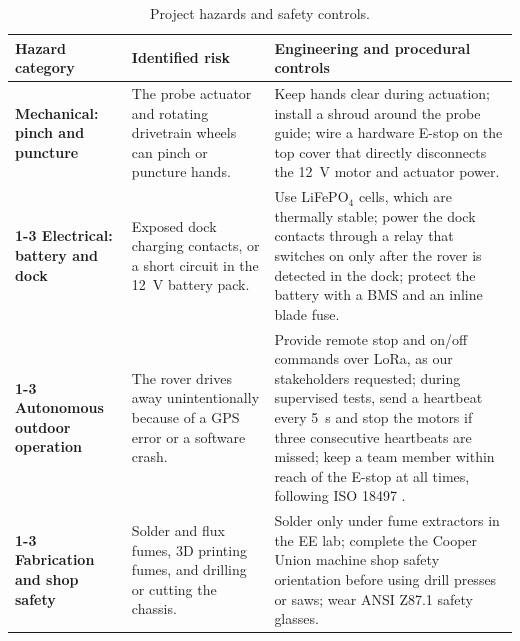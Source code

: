 \documentclass[12pt, letterpaper]{article}
\begin{document}
\begin{table}[htbp]
    \centering
    \footnotesize
    \setlength{\extrarowheight}{2pt}
    \begin{tabularx}{\textwidth}{@{}>{\raggedright\arraybackslash\bfseries}p{} >{\raggedright\arraybackslash}p{} >{\raggedright\arraybackslash}X@{}}
    \toprule
    \textbf{Hazard category} & \textbf{Identified risk} & \textbf{Engineering and procedural controls} \\
    \midrule[0.8pt]
    Mechanical: pinch and puncture & The probe actuator and rotating drivetrain wheels can pinch or puncture hands. & Keep hands clear during actuation; install a shroud around the probe guide; wire a hardware E-stop on the top cover that directly disconnects the 12~V motor and actuator power. \\
    \cmidrule[0.2pt]{1-3}
    Electrical: battery and dock & Exposed dock charging contacts, or a short circuit in the 12~V battery pack. & Use LiFePO$_4$ cells, which are thermally stable; power the dock contacts through a relay that switches on only after the rover is detected in the dock; protect the battery with a BMS and an inline blade fuse. \\
    \cmidrule[0.2pt]{1-3}
    Autonomous outdoor operation & The rover drives away unintentionally because of a GPS error or a software crash. & Provide remote stop and on/off commands over LoRa, as our stakeholders requested; during supervised tests, send a heartbeat every 5~s and stop the motors if three consecutive heartbeats are missed; keep a team member within reach of the E-stop at all times, following ISO 18497 \cite{iso18497}. \\
    \cmidrule[0.2pt]{1-3}
    Fabrication and shop safety & Solder and flux fumes, 3D printing fumes, and drilling or cutting the chassis. & Solder only under fume extractors in the EE lab; complete the Cooper Union machine shop safety orientation before using drill presses or saws; wear ANSI Z87.1 safety glasses. \\
    \bottomrule
    \end{tabularx}
    \caption{Project hazards and safety controls.}
    \label{tab:safety}
\end{table}
\end{document}
